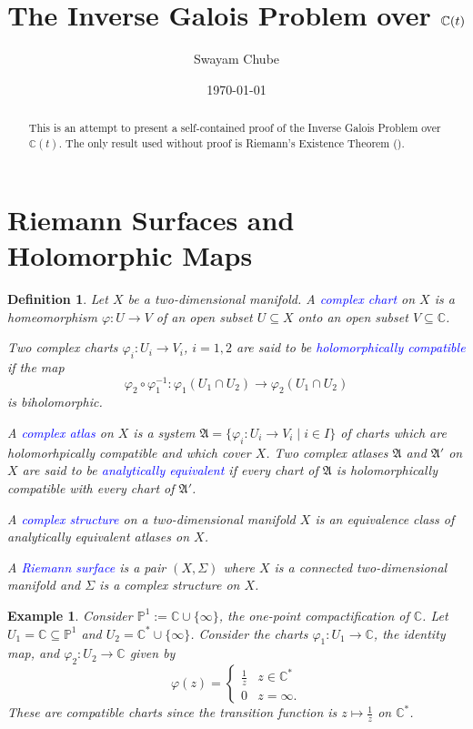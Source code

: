\documentclass[12pt]{article}
\title{The Inverse Galois Problem over $\bbC(t)$}
\author{Swayam Chube}
\date{\today}
\theoremstyle{thmstyle}
\theoremstyle{defstyle}
\newtheorem{definition}[theorem]{Definition}
\newtheorem{example}[theorem]{Example}
\newcommand{\bbC}{\mathbb{C}}
\newcommand{\frakA}{\mathfrak{A}}
\newcommand{\define}[1]{\textcolor{blue}{\textit{#1}}}
\newcommand{\bbP}{\mathbb{P}}
\begin{document}
\maketitle

\begin{abstract}
    This is an attempt to present a self-contained proof of the Inverse Galois Problem over $\bbC(t)$. The only result used without proof is Riemann's Existence Theorem ().
\end{abstract}

\section{Riemann Surfaces and Holomorphic Maps}

\begin{definition}
    Let $X$ be a two-dimensional manifold. A \define{complex chart} on $X$ is a homeomorphism $\varphi: U\to V$ of an open subset $U\subseteq X$ onto an open subset $V\subseteq\bbC$.

    Two complex charts $\varphi_i: U_i\to V_i$, $i = 1,2$ are said to be \define{holomorphically compatible} if the map 
    \begin{equation*}
        \varphi_2\circ\varphi_1^{-1}: \varphi_1(U_1\cap U_2)\to\varphi_2(U_1\cap U_2)
    \end{equation*}
    is biholomorphic.

    A \define{complex atlas} on $X$ is a system $\frakA = \{\varphi_i: U_i\to V_i\mid i\in I\}$ of charts which are holomorhpically compatible and which cover $X$. Two complex atlases $\frakA$ and $\frakA'$ on $X$ are said to be \define{analytically equivalent} if every chart of $\frakA$ is holomorphically compatible with every chart of $\frakA'$.

    A \define{complex structure} on a two-dimensional manifold $X$ is an equivalence class of analytically equivalent atlases on $X$.

    A \define{Riemann surface} is a pair $(X,\Sigma)$ where $X$ is a connected two-dimensional manifold and $\Sigma$ is a complex structure on $X$.
\end{definition}

\begin{example}
    Consider $\bbP^1 := \bbC\cup\{\infty\}$, the one-point compactification of $\bbC$. Let $U_1 = \bbC\subseteq\bbP^1$ and $U_2 = \bbC^\ast\cup\{\infty\}$. Consider the charts $\varphi_1: U_1\to\bbC$, the identity map, and $\varphi_2: U_2\to\bbC$ given by 
    \begin{equation*}
        \varphi(z) = 
        \begin{cases}
            \frac{1}{z} & z\in\bbC^\ast\\
            0 & z = \infty.
        \end{cases}
    \end{equation*}
    These are compatible charts since the transition function is $z\mapsto\frac{1}{z}$ on $\bbC^\ast$.
\end{example}
\end{document}
